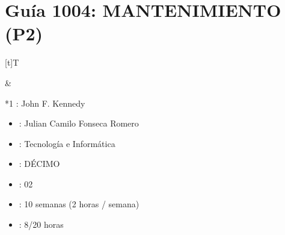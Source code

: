 \documentclass[letterpaper,10pt,spanish]{sphinxmanual}
\begin{document}
\sphinxstepscope


\section{Guía 1004: MANTENIMIENTO (P2)}
\label{\detokenize{1_guias/10informatica/G1004:guia-1004-mantenimiento-p2}}\label{\detokenize{1_guias/10informatica/G1004::doc}}

\begin{savenotes}\sphinxattablestart
\sphinxthistablewithglobalstyle
\centering
\begin{tabular}[t]{}
\sphinxtoprule
\sphinxtableatstartofbodyhook

\begin{savenotes}\sphinxattablestart
\sphinxthistablewithglobalstyle
\centering
\begin{tabulary}{\linewidth}[t]{T}
\sphinxtoprule
\sphinxtableatstartofbodyhook
\sphinxAtStartPar
{}
\\
\sphinxbottomrule
\end{tabulary}
\sphinxtableafterendhook\par
\sphinxattableend\end{savenotes}
&

\begin{savenotes}\sphinxattablestart
\sphinxthistablewithglobalstyle
\raggedright
\begin{tabular}[t]{*{1}{}}
\sphinxtoprule
\sphinxtableatstartofbodyhook
\sphinxAtStartPar
{}: John F. Kennedy
\begin{itemize}
\item {} 
\sphinxAtStartPar
{}: Julian Camilo Fonseca Romero

\item {} 
\sphinxAtStartPar
{}: Tecnología e Informática

\item {} 
\sphinxAtStartPar
{}: DÉCIMO

\item {} 
\sphinxAtStartPar
{}: 02

\item {} 
\sphinxAtStartPar
{}: 10 semanas (2 horas / semana)

\item {} 
\sphinxAtStartPar
{}: 8/20 horas

\end{itemize}
\\
\sphinxbottomrule
\end{tabular}
\sphinxtableafterendhook\par
\sphinxattableend\end{savenotes}
\\
\sphinxbottomrule
\end{tabular}
\sphinxtableafterendhook\par
\sphinxattableend\end{savenotes}
\end{document}
